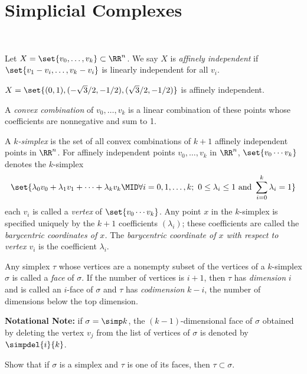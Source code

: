 \section{Simplicial Complexes}~
\begin{definition}
  Let $X = \set{v_0, \ldots, v_k} \subset \RR^n$. We say $X$ is \emph{affinely
    independent} if $\set{v_1 - v_i, \ldots, v_k - v_i}$ is linearly
  independent for all $v_i$.
\end{definition}
\begin{example}
  $X = \set{(0,1), (-\sqrt{3}/2, -1/2), (\sqrt{3}/2, -1/2)}$ is affinely
  independent.
\end{example}
\begin{definition}
  A \emph{convex combination} of $v_0, \ldots, v_k$ is a linear combination
  of these points whose coefficients are nonnegative and sum to 1.
\end{definition}
\begin{definition}[$k$-simplex]
  A \emph{$k$-simplex} is the set of all convex combinations of $k+1$ affinely
  independent points in $\RR^n$. For affinely independent points $v_0, \ldots,
  v_k$ in $\RR^n$, $\set{v_0\cdots v_k}$ denotes the $k$-simplex
  \[
    \set{\lambda_0 v_0 + \lambda_1v_1 + \cdots + \lambda_kv_k \MID \forall i =0,
      1, \ldots, k;\ 0 \leq \lambda_i \leq 1 \text{ and } \sum_{i=0}^k \lambda_i
    = 1}
  \]
  each $v_i$ is called a \emph{vertex} of $\set{v_0 \cdots v_k}$. Any point $x$
  in the $k$-simplex is specified uniquely by the $k+1$ coefficients
  $(\lambda_i)$; these coefficients are called the \emph{barycentric coordinates
    of $x$.} The \emph{barycentric coordinate of $x$ with respect to vertex
    $v_i$} is the coefficient $\lambda_i$.
\end{definition}
\begin{definition}
  Any simplex $\tau$ whose vertices are a nonempty subset of the vertices of a
  $k$-simplex $\sigma$ is called a \emph{face} of $\sigma$. If the number of
  vertices is $i+1$, then $\tau$ has \emph{dimension} $i$ and is called an
  $i$-face of $\sigma$ and $\tau$ has \emph{codimension} $k-i$, the number of
  dimensions below the top dimension.
\end{definition}
\textbf{Notational Note:} if $\sigma = \simp k$, the $(k-1)$-dimensional face of
$\sigma$ obtained by deleting the vertex $v_j$ from the list of vertices of
$\sigma$ is denoted by $\simpdel{i}{k}$.
\begin{problem}[15.11]
  Show that if $\sigma$ is a simplex and $\tau$ is one of its faces, then $\tau
  \subset \sigma$.
\end{problem}
